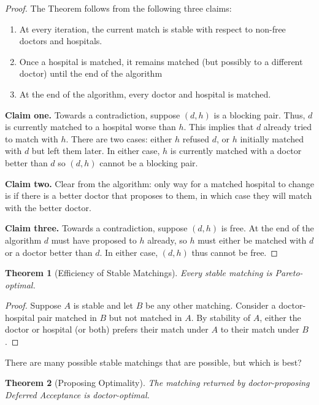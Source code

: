 \documentclass[dvipsnames]{article}
\newtheorem{theorem}{Theorem}[section]
\theoremstyle{definition}
\theoremstyle{remark}
\begin{document}
\begin{proof}
	The Theorem follows from the following three claims:
	\begin{enumerate}
		\item At every iteration, the current match is stable with respect to non-free doctors and hospitals.
		\item Once a hospital is matched, it remains matched (but possibly to a different doctor) until the end of the algorithm
		\item At the end of the algorithm, every doctor and hospital is matched. 
	\end{enumerate}

	\textbf{Claim one.} Towards a contradiction, suppose $(d,h)$ is a blocking pair. Thus, $d$ is currently matched to a hospital worse than $h$. This implies that $d$ already tried to match with $h$. There are two cases: either $h$ refused $d$, or $h$ initially matched with $d$ but left them later. In either case, $h$ is currently matched with a doctor better than $d$ so $(d,h)$ cannot be a blocking pair.
	
	\textbf{Claim two.} Clear from the algorithm: only way for a matched hospital to change is if there is a better doctor that proposes to them, in which case they will match with the better doctor.
	
	\textbf{Claim three.} Towards a contradiction, suppose $(d,h)$ is free. At the end of the algorithm $d$ must have proposed to $h$ already, so $h$ must either be matched with $d$ or a doctor better than $d$. In either case, $(d,h)$ thus cannot be free.
\end{proof}

\begin{theorem}[Efficiency of Stable Matchings]
	Every stable matching is Pareto-optimal. 
\end{theorem}

\begin{proof}
	Suppose $A$ is stable and let $B$ be any other matching. Consider a doctor-hospital pair matched in $B$ but not matched in $A$. By stability of $A$, either the doctor or hospital (or both) prefers their match under $A$ to their match under $B$.
\end{proof}

There are many possible stable matchings that are possible, but which is best?

\begin{theorem}[Proposing Optimality]
	The matching returned by doctor-proposing Deferred Acceptance is doctor-optimal. 
\end{theorem} 
\end{document}
